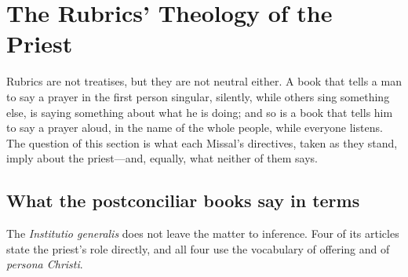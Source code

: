 \section{The Rubrics' Theology of the Priest}

Rubrics are not treatises, but they are not neutral either. A book that tells a man to say a prayer in the first person singular, silently, while others sing something else, is saying something about what he is doing; and so is a book that tells him to say a prayer aloud, in the name of the whole people, while everyone listens. The question of this section is what each Missal's directives, taken as they stand, imply about the priest---and, equally, what neither of them says.

\subsection{What the postconciliar books say in terms}

The \emph{Institutio generalis} does not leave the matter to inference. Four of its articles state the priest's role directly, and all four use the vocabulary of offering and of \emph{persona Christi}.

